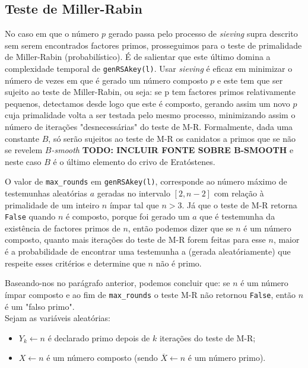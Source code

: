 \documentclass[dvipsnames]{article}
\begin{document}
\subsection{Teste de Miller-Rabin}

No caso em que o número $p$ gerado passa pelo processo de \textit{sieving} supra descrito sem serem encontrados factores primos, prosseguimos para o teste de primalidade de Miller-Rabin (probabilístico). É de salientar que este último domina a complexidade temporal de \texttt{genRSAkey(l)}. Usar \textit{sieving} é eficaz em minimizar o número de vezes em que é gerado um número composto $p$ e este tem que ser sujeito ao teste de Miller-Rabin, ou seja: se p tem factores primos relativamente pequenos, detectamos desde logo que este é composto, gerando assim um novo $p$ cuja primalidade volta a ser testada pelo mesmo processo, minimizando assim o número de iterações "desnecessárias" do teste de M-R. Formalmente, dada uma constante $B$, só serão sujeitos ao teste de M-R os canidatos a primos que se não se revelem $B$\textit{-smooth} \textbf{TODO: INCLUIR FONTE SOBRE B-SMOOTH} e neste caso $B$ é o último elemento do crivo de Eratóstenes.

\vskip 0.4cm

\noindent O valor de \texttt{max\_rounds} em \texttt{genRSAkey(l)}, corresponde ao número máximo de testemunhas aleatórias $a$ geradas no intervalo $[2,n-2]$ com relação à primalidade de um inteiro $n$ ímpar tal que $n>3$. Já que o teste de M-R retorna \texttt{False} quando $n$ é composto, porque foi gerado um $a$ que é testemunha da existência de factores primos de $n$, então podemos dizer que se $n$ é um número composto, quanto mais iterações do teste de M-R forem feitas para esse $n$, maior é a probabilidade de encontrar uma testemunha a (gerada aleatóriamente) que respeite esses critérios e determine que $n$ não é primo.

\vskip 0.4cm

\noindent Baseando-nos no parágrafo anterior, podemos concluir que: se $n$ é um número ímpar composto e ao fim de \texttt{max\_rounds} o teste M-R não retornou \texttt{False}, então $n$ é um "falso primo".\\

\noindent Sejam as variáveis aleatórias:

\begin{itemize}
  \item $Y_k \leftarrow n$ é declarado primo depois de $k$ iterações do teste de M-R;
  \item $X \leftarrow n$ é um número composto (sendo $\overline{X} \leftarrow n$ é um número primo).
\end{itemize}
\end{document}
